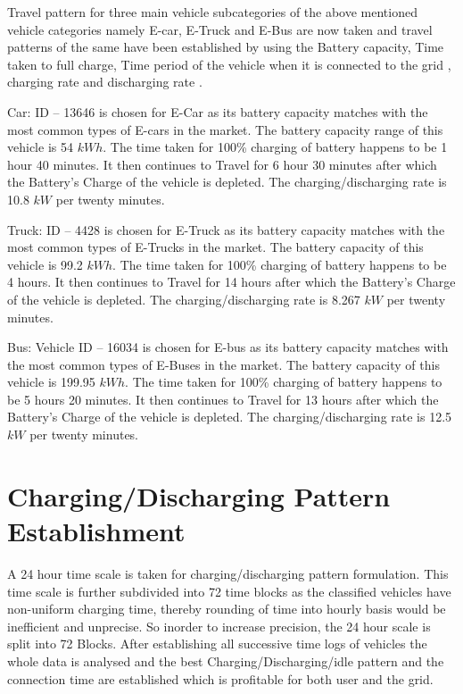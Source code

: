 	Travel pattern for three main vehicle subcategories of the above mentioned vehicle categories namely E-car, E-Truck and E-Bus are now taken and travel patterns of the same have been established by using the Battery capacity, Time taken to full charge, Time period of the vehicle when it is connected to the grid , charging rate and discharging rate \cite{evdata}.
	
	Car: ID – 13646 \cite{evdata} is chosen for E-Car as its battery capacity matches with the most common types of E-cars in the market. The
	battery capacity range of this vehicle is 54 $kWh$. The time taken for 100\% charging of battery
	happens to be 1 hour 40 minutes. It then continues to Travel for 6 hour 30 minutes after which the Battery's Charge of the vehicle is depleted. The charging/discharging rate is 10.8 $kW$ per twenty minutes.
	
	Truck: ID – 4428 \cite{evdata} is chosen for E-Truck as its battery capacity matches with the most common types of E-Trucks in the market. The
	battery capacity of this vehicle is 99.2 $kWh$. The time taken for 100\% charging of battery
	happens to be 4 hours. It then continues to Travel for 14 hours after which the Battery's Charge of the vehicle is depleted.  The charging/discharging rate is 8.267 $kW$ per twenty minutes.
	
	Bus: Vehicle ID – 16034 \cite{evdata} is chosen for E-bus as its battery capacity matches with the most common types of E-Buses in the market. The
	battery capacity of this vehicle is 199.95 $kWh$. The time taken for 100\% charging of battery
	happens to be 5 hours 20 minutes. It then continues to Travel for 13 hours after which the Battery's Charge of the vehicle is depleted. The charging/discharging rate is 12.5 $kW$ per twenty minutes.
	



	\section{Charging/Discharging Pattern Establishment}
	
	A 24 hour time scale is taken for charging/discharging pattern formulation. This time scale is further subdivided into 72 time blocks as the classified vehicles have non-uniform charging time, thereby rounding of time into hourly basis would be inefficient and unprecise. So inorder to increase precision, the 24 hour scale is split into 72 Blocks. After establishing all successive time logs of vehicles the whole data is analysed and the best Charging/Discharging/idle pattern and the connection time are established which is profitable for both user and the grid.
	
